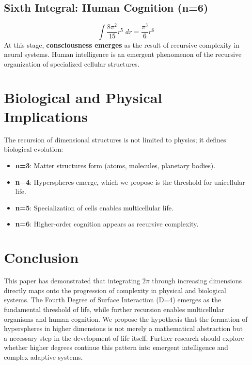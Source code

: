 \documentclass{article}
\begin{document}
\subsection{Sixth Integral: Human Cognition (n=6)}
\begin{equation}
\int \frac{8\pi^2}{15} r^5 \; dr = \frac{\pi^3}{6} r^6
\end{equation}
At this stage, \textbf{consciousness emerges} as the result of recursive complexity in neural systems. Human intelligence is an emergent phenomenon of the recursive organization of specialized cellular structures.

\section{Biological and Physical Implications}
The recursion of dimensional structures is not limited to physics; it defines biological evolution:
\begin{itemize}
    \item \textbf{n=3}: Matter structures form (atoms, molecules, planetary bodies).
    \item \textbf{n=4}: Hyperspheres emerge, which we propose is the threshold for unicellular life.
    \item \textbf{n=5}: Specialization of cells enables multicellular life.
    \item \textbf{n=6}: Higher-order cognition appears as recursive complexity.
\end{itemize}

\section{Conclusion}
This paper has demonstrated that integrating $2\pi$ through increasing dimensions directly maps onto the progression of complexity in physical and biological systems. The Fourth Degree of Surface Interaction (D=4) emerges as the fundamental threshold of life, while further recursion enables multicellular organisms and human cognition. We propose the hypothesis that the formation of hyperspheres in higher dimensions is not merely a mathematical abstraction but a necessary step in the development of life itself. Further research should explore whether higher degrees continue this pattern into emergent intelligence and complex adaptive systems.
\end{document}
